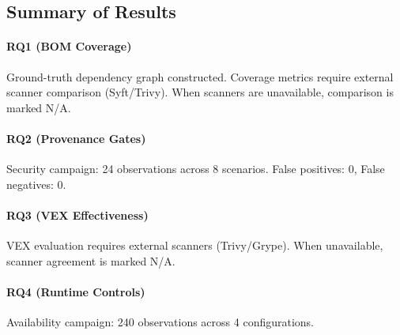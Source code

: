 
\subsection{Summary of Results}

\paragraph{RQ1 (BOM Coverage)}
Ground-truth dependency graph constructed. 
Coverage metrics require external scanner comparison (Syft/Trivy).
When scanners are unavailable, comparison is marked N/A.

\paragraph{RQ2 (Provenance Gates)}
Security campaign: 24 observations across 8 scenarios. False positives: 0, False negatives: 0.

\paragraph{RQ3 (VEX Effectiveness)}
VEX evaluation requires external scanners (Trivy/Grype). 
When unavailable, scanner agreement is marked N/A.

\paragraph{RQ4 (Runtime Controls)}
Availability campaign: 240 observations across 4 configurations.